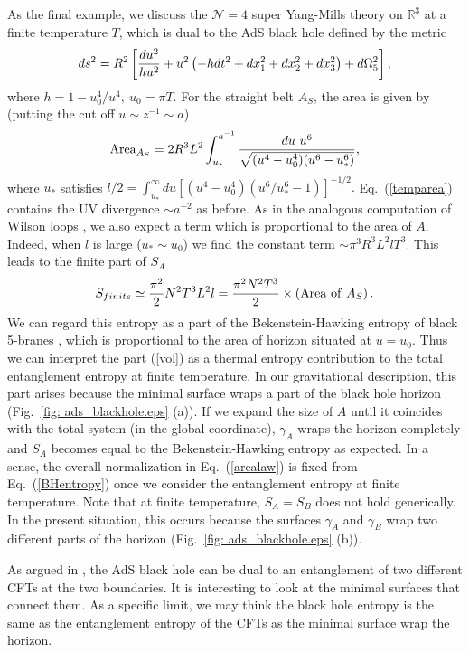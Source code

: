 \documentclass[amsmath,amssymb,nofootinbib,eqsecnum,tighten,prd,12pt]{revtex4}
\def\frac#1#2{{#1\over #2}}
\def\s{\sqrt}
\def\f {\frac}
\def\frac#1#2{{#1\over #2}}
\def\s{\sqrt}
\def\be{\begin{equation}}
\def\ee{\end{equation}}
\begin{document}
As the final example, we discuss the $\mathcal{N}=4$
super Yang-Mills theory on $\mathbb{R}^3$ at a finite
temperature $T$, which is dual to the AdS black hole
defined by the metric
\cite{Witten}
\be ds^2=R^2\left[\f{du^2}{hu^2}+u^2\left(-h
dt^2+dx_1^2+dx_2^2+dx_3^2\right)+d\Omega_5^2\right], \ee
where $h=1-u_0^4/u^4,\ u_0=\pi T$.
For the straight belt $A_{S}$,
the area is given by (putting the cut off $u\sim z^{-1}\sim a$)
\begin{eqnarray}
{\rm
Area}_{A_S}=2R^3L^2\int^{a^{-1}}_{u_*}
\f{du~ u^6}{\s{(u^4-u_0^4)(u^6-u_*^6)}}, \label{temparea}
\end{eqnarray}
where $u_*$ satisfies $ l/2=\int^{\infty}_{u_*}du
[(u^4-u_0^4)(u^6/u_*^6-1)]^{-1/2}. $ Eq.\ (\ref{temparea}) contains
the UV divergence $\sim a^{-2}$ as before. As in the analogous
computation of Wilson loops \cite{Wilsontemp}, we also expect a term
which is proportional to the area of $A$. Indeed, when $l$ is large
($u_*\sim u_0$) we find the constant term $\sim \pi^3R^3L^2lT^3$.
This leads to the finite part of  $S_A$ \be
S_{finite}\simeq\f{\pi^2}{2}N^2
T^3L^2l=\f{\pi^2N^2T^3}{2}\times\left({\rm Area~ of}~ A_{S}\right).
\label{vol}\ee We can regard this entropy as a part of the
Bekenstein-Hawking entropy of black 5-branes \cite{GKP}, which is
proportional to the area of horizon situated at $u=u_0$. Thus we can
interpret the part (\ref{vol}) as a thermal entropy contribution to
the total entanglement entropy at finite temperature. In our
gravitational description, this part arises because the minimal
surface wraps a part of the black hole horizon (Fig.\ \ref{fig:
ads_blackhole.eps} (a)). If we expand the size of $A$ until it
coincides with the total system (in the global coordinate),
$\gamma_A$ wraps the horizon completely and $S_A$ becomes equal to
the Bekenstein-Hawking entropy as expected. In a sense, the overall
normalization in Eq.\ (\ref{arealaw}) is fixed from Eq.\
(\ref{BHentropy}) once we consider the entanglement entropy at
finite temperature. Note that at finite temperature, $S_A = S_B$
does not hold generically. In the present situation, this occurs
because the surfaces $\gamma_A$ and $\gamma_B$ wrap two different
parts of the horizon (Fig.\ \ref{fig: ads_blackhole.eps} (b)).



As argued in \cite{MBH,Einhorn}, the AdS black hole can be dual to an entanglement
of two different CFTs at the two boundaries.  It is interesting to look at
the minimal surfaces
that connect them. As a specific limit, we may think the black hole
entropy is the same as the entanglement entropy of the CFTs  as the minimal surface
wrap the horizon.
\end{document}
